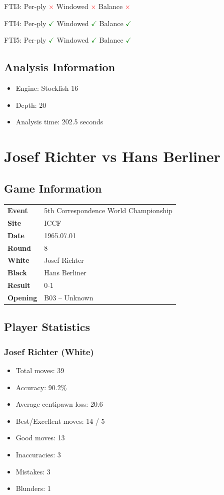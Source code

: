 \documentclass[11pt]{book}
\begin{document}
FTI3: Per-ply \textcolor{red}{$\times$} \quad Windowed \textcolor{red}{$\times$} \quad Balance \textcolor{red}{$\times$}

FTI4: Per-ply \textcolor{green}{$\checkmark$} \quad Windowed \textcolor{green}{$\checkmark$} \quad Balance \textcolor{green}{$\checkmark$}

FTI5: Per-ply \textcolor{green}{$\checkmark$} \quad Windowed \textcolor{green}{$\checkmark$} \quad Balance \textcolor{green}{$\checkmark$}

\section{Analysis Information}
\begin{itemize}
\item Engine: Stockfish 16
\item Depth: 20
\item Analysis time: 202.5 seconds
\end{itemize}

\chapter{Josef Richter vs Hans Berliner}

\section{Game Information}
\begin{tabular}{ll}
\textbf{Event} & 5th Correspondence World Championship \\
\textbf{Site} & ICCF \\
\textbf{Date} & 1965.07.01 \\
\textbf{Round} & 8 \\
\textbf{White} & Josef Richter \\
\textbf{Black} & Hans Berliner \\
\textbf{Result} & 0-1 \\
\textbf{Opening} & B03 -- Unknown \\
\end{tabular}

\section{Player Statistics}

\subsection{Josef Richter (White)}
\begin{itemize}
\item Total moves: 39
\item Accuracy: 90.2\%
\item Average centipawn loss: 20.6
\item Best/Excellent moves: 14 / 5
\item Good moves: 13
\item Inaccuracies: 3
\item Mistakes: 3
\item Blunders: 1
\end{itemize}
\end{document}
